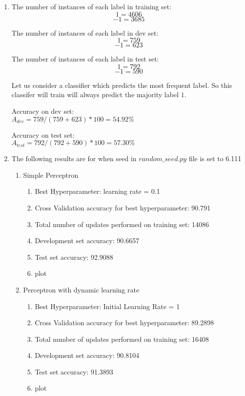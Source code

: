 \begin{enumerate}
	\item
	The number of instances of each label in training set:
	$$1 	= 4606 $$
	$$-1 = 3685 $$
	
	The number of instances of each label in dev set:
	$$1 	= 759 $$
	$$-1 = 623 $$
	
	The number of instances of each label in test set:
	$$1 	= 792 $$
	$$-1 = 590 $$
	
	Let us consider a classifier which predicts the most frequent label. So this classifer will train will always predict the majority label $1$.
	
	Accuracy on dev set: \\
	$A_{dev} = 759/(759+623)*100 = 54.92 \%$
	
	Accuracy on test set: \\
	$A_{test} = 792/(792+590)*100 = 57.30 \%$
	
	\item
	The following results are for when seed in $random\_seed.py$ file is set to 6.111
	\begin{enumerate}
		\item Simple Perceptron
			\begin{enumerate}
				\item Best Hyperparameter: learning rate = 0.1
				\item Cross Validation accuracy for best hyperparameter: 90.791
				\item Total number of updates performed on training set: 14086
				\item Development set accuracy: 90.6657
				\item Test set accuracy: 92.9088
				\item plot
			\end{enumerate}
			
		\item Perceptron with dynamic learning rate
			\begin{enumerate}
				\item Best Hyperparameter: Initial Learning Rate = 1
				\item Cross Validation accuracy for best hyperparameter: 89.2898
				\item Total number of updates performed on training set: 16408
				\item Development set accuracy: 90.8104
				\item Test set accuracy: 91.3893
				\item plot
			\end{enumerate}


\end{enumerate}
\end{enumerate}
